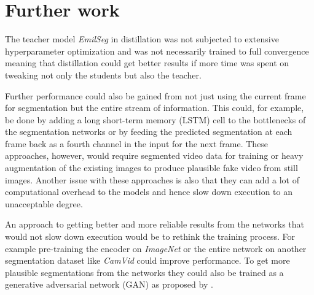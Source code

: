 \documentclass{kththesis}
\begin{document}


\section{Further work}
The teacher model \textit{EmilSeg} in distillation
was not subjected to extensive hyperparameter optimization and was not
necessarily trained to full convergence meaning that distillation could get
better results if more time was spent on tweaking not only the students but
also the teacher.

Further performance could also be gained from not just using the current
frame for segmentation but the entire stream of information. This could, for
example, be done by adding a long short-term memory (LSTM) cell to the
bottlenecks of the segmentation networks or by feeding the predicted
segmentation at each frame back as a fourth channel in the input for the next
frame. These approaches, however, would require segmented video data for training
or heavy augmentation of the existing images to produce plausible fake video
from still images. Another issue with these approaches is also that they can
add a lot of computational overhead to the models and hence slow down execution to an
unacceptable degree.

An approach to getting better and more reliable results from the networks that
would not slow down execution would be to rethink the training process. For
example pre-training the encoder on \textit{ImageNet} or the entire network on
another segmentation dataset like \textit{CamVid} could improve performance. To
get more plausible segmentations from the networks they could also be trained as
a generative adversarial network
(GAN) as proposed by \textcite{AdverserialSegmentation}.
\end{document}
